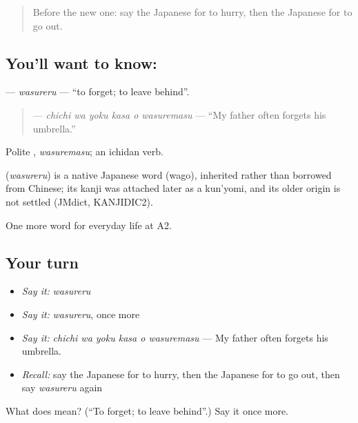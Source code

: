 \begin{quote}
Before the new one: say the Japanese for to hurry, then the Japanese for to go out.
\end{quote}

\subsection*{You'll want to know: }
\textbf{} — \emph{wasureru} — \textquotedblleft{}to forget; to leave behind\textquotedblright{}.

\begin{quote}
\textbf{   } — \emph{chichi wa yoku kasa o wasuremasu} — \textquotedblleft{}My father often forgets his umbrella.\textquotedblright{}
\end{quote}

Polite \textbf{}, \emph{wasuremasu}; an ichidan verb.

\begin{cousinweb}
\textbf{} (\emph{wasureru}) is a native Japanese word (wago), inherited rather than borrowed from Chinese; its kanji was attached later as a kun'yomi, and its older origin is not settled (JMdict, KANJIDIC2).
\end{cousinweb}

\begin{grammarlens}[title={What you've built}]
One more word for everyday life at A2.
\end{grammarlens}

\subsection*{Your turn}
\begin{itemize}
\raggedright
  \item \emph{Say it:} \emph{wasureru}
  \item \emph{Say it:} \emph{wasureru}, once more
  \item \emph{Say it:} \emph{chichi wa yoku kasa o wasuremasu} — My father often forgets his umbrella.
  \item \emph{Recall:} say the Japanese for to hurry, then the Japanese for to go out, then say \emph{wasureru} again
\end{itemize}

\begin{tcolorbox}[breakable,colback=teal!4,colframe=teal!35!black,title={Before you move on}]
What does  mean? (\textquotedblleft{}To forget; to leave behind\textquotedblright{}.) Say it once more.
\end{tcolorbox}

